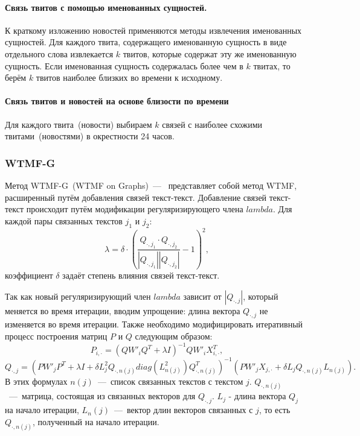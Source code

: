         \paragraph{Связь твитов с помощью именованных сущностей.}
            К краткому изложению новостей применяются методы извлечения именованных сущностей.
            Для каждого твита, содержащего именованную сущность в виде отдельного слова извлекается $k$ твитов, которые содержат эту же именованную сущность.
            Если именованная сущность содержалась более чем в $k$ твитах, то берём $k$ твитов наиболее близких во времени к исходному.

        \paragraph{Связь твитов и новостей на основе близости по времени}
            Для каждого твита~(новости) выбираем $k$ связей с наиболее схожими твитами~(новостями) в окрестности 24 часов.
    \subsubsection{WTMF-G}
        Метод WTMF-G~(WTMF on Graphs)~---~ представляет собой метод WTMF, расширенный путём добавления связей текст-текст.
        Добавление связей текст-текст происходит путём модификации регуляризирующего члена $lambda$. Для каждой пары связанных текстов $j_1$ и $j_2$:
        $$\lambda = \delta \cdot (\dfrac{Q_{\cdot,j_1}\cdot Q_{\cdot,j_2}}{|Q_{\cdot,j_1}|| Q_{\cdot,j_2}|}-1)^2,$$
        коэффициент $\delta$ задаёт степень влияния связей текст-текст.

        Так как новый регуляризирующий член $lambda$ зависит от $|Q_{\cdot,j}|$, который меняется во время итерации, вводим упрощение: длина вектора $Q_{\cdot,j}$ не изменяется во время итерации.
        Также необходимо модифицировать итеративный процесс построения матриц $P$ и $Q$ следующим образом:
        $$P_{i, \cdot} = (Q W'_i Q^T + \lambda I)^{-1} Q W'_i X_{i,\cdot}^T,$$
        $$Q_{\cdot, j} = (P W'_j P^T + \lambda I + \delta  L_j^2 Q_{\cdot,n(j)} diag(L^2_{n(j)})Q_{\cdot,n(j)}^T)^{-1}   (P W'_j X_{j,\cdot} + \delta  L_j Q_{\cdot,n(j)} L_{n(j)}).$$
        В этих формулах $n(j)$~---~список связанных текстов с текстом $j$. $Q_{\cdot,n(j)}$~---~матрица, состоящая из связанных векторов для $Q_{\cdot, j}$.
        $L_j$ - длина вектора $Q_j$ на начало итерации, $L_n(j)$~---~вектор длин векторов связанных с $j$, то есть $Q_{\cdot,n(j)}$, полученный на начало итерации.
